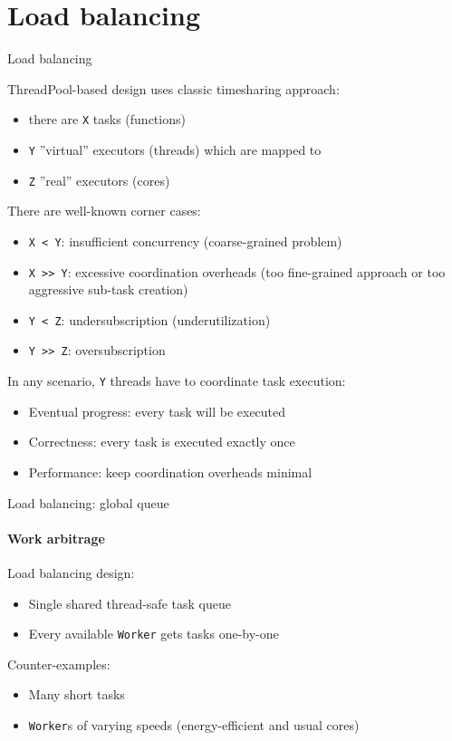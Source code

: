 \section{Load balancing}
\showTOC


\begin{frame}{Load balancing}

ThreadPool-based design uses classic timesharing approach: 
\begin{itemize}
    \item there are \texttt{X} tasks (functions) 
    \item \texttt{Y} ''virtual'' executors (threads) which are mapped to
    \item \texttt{Z} ''real'' executors (cores)
\end{itemize}
\pause
There are well-known corner cases:
\begin{itemize}
    \item \texttt{X < Y}: insufficient concurrency (coarse-grained problem)
    \item \texttt{X >> Y}: excessive coordination overheads (too fine-grained approach or too aggressive sub-task creation)
    \item \texttt{Y < Z}: undersubscription (underutilization)
    \item \texttt{Y >> Z}: oversubscription
\end{itemize}
\pause
In any scenario, \texttt{Y} threads have to coordinate task execution:
\begin{itemize}
    \item Eventual progress: every task will be executed
    \item Correctness: every task is executed exactly once
    \item Performance: keep coordination overheads minimal  
\end{itemize}


\end{frame}


\begin{frame}{Load balancing: global queue}
\framesubtitle{Work arbitrage}

Load balancing design:
\begin{itemize}
    \item Single shared thread-safe task queue
    \item Every available \texttt{Worker} gets tasks one-by-one
\end{itemize}

Counter-examples:
\begin{itemize}
    \item Many short tasks
    \item \texttt{Worker}s of varying speeds (energy-efficient and usual cores)
\end{itemize}

\end{frame}

